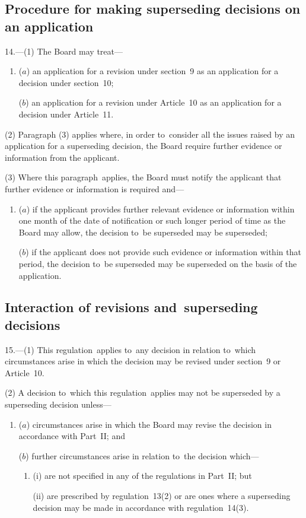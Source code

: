 \documentclass[12pt,a4paper]{article}
\begin{document}
\subsection[14. Procedure for making superseding decisions on an application]{Procedure for making superseding decisions on an application}

14.---(1)  The Board may treat—
\begin{enumerate}\item[]
($a$) an application for a revision under section~9 as an application for a decision under section~10;

($b$) an application for a revision under Article~10 as an application for a decision under Article~11.
\end{enumerate}

(2) Paragraph (3) applies where, in order to~consider all the issues raised by an application for a superseding decision, the Board require further evidence or information from the applicant.

(3) Where this paragraph~applies, the Board must notify the applicant that further evidence or information is required and—
\begin{enumerate}\item[]
($a$) if the applicant provides further relevant evidence or information within one month of the date of notification or such longer period of time as the Board may allow, the decision to~be superseded may be superseded;

($b$) if the applicant does not provide such evidence or information within that period, the decision to~be superseded may be superseded on the basis of the application.
\end{enumerate}

\subsection[15. Interaction of revisions and~superseding decisions]{Interaction of revisions and~superseding decisions}

15.---(1)  This regulation~applies to~any decision in relation to~which circumstances arise in which the decision may be revised under section~9 or Article~10.

(2) A decision to~which this regulation~applies may not be superseded by a superseding decision unless—
\begin{enumerate}\item[]
($a$) circumstances arise in which the Board may revise the decision in accordance with Part~II; and

($b$) further circumstances arise in relation to~the decision which—
\begin{enumerate}\item[]
(i) are not specified in any of the regulations in Part~II; but

(ii) are prescribed by regulation~13(2) or are ones where a superseding decision may be made in accordance with regulation~14(3).
\end{enumerate}
\end{enumerate}
\end{document}
